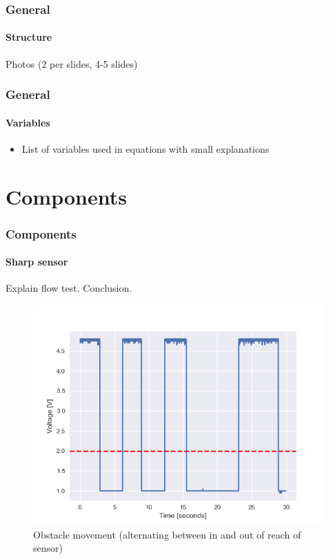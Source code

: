\documentclass{beamer}
\begin{document}

\begin{frame}
\frametitle{General}
\framesubtitle{Structure}
Photos (2 per slides, 4-5 slides)
\end{frame}


\begin{frame}
\frametitle{General}
\framesubtitle{Variables}
\begin{itemize}
\item List of variables used in equations with small explanations
\end{itemize}
\end{frame}

\section{Components} 

\begin{frame}
\frametitle{Components}
\framesubtitle{Sharp sensor}
Explain flow test. Conclusion.
\begin{figure}[hbtp]
\centering
\includegraphics[scale=0.4]{figures/sharp-flow.png}
\caption{Obstacle movement (alternating between in and out of reach of sensor)}
\end{figure}
\end{frame}


\end{document}
